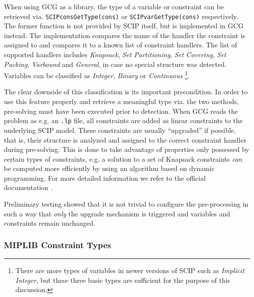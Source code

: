 				When using \ac{GCG} as a library, the type of a variable or constraint can be retrieved via. \lstinline|SCIPconsGetType(cons)| or \lstinline|SCIPvarGetType(cons)| respectively.
				The former function is not provided by \ac{SCIP} itself, but is implemented in \ac{GCG} instead.
				The implementation compares the name of the handler the constraint is assigned to and compares it to a known list of constraint handlers. 
				The list of supported handlers includes \emph{Knapsack}, \emph{Set Partitioning}, \emph{Set Covering}, \emph{Set Packing}, \emph{Varbound} and \emph{General}, in case no special structure was detected. 
				Variables can be classified as \emph{Integer}, \emph{Binary} or \emph{Continuous}
				\footnote{There are more types of variables in newer versions of \ac{SCIP} such as \emph{Implicit Integer}, but these three basic types are sufficient for the purpose of this discussion.}.
				
				The clear downside of this classification is its important precondition.
				In order to use this feature properly and retrieve a meaningful type via. the two methods, pre-solving must have been executed prior to detection.
				When \ac{GCG} reads the problem as e.g. an \lstinline|.lp| file, all constraints are added as linear constraints to the underlying \ac{SCIP} model.
				These constraints are usually \enquote{upgraded} if possible, that is, their structure is analyzed and assigned to the correct constraint handler during pre-solving.
				This is done to take advantage of properties only possessed by certain types of constraints, e.g. a solution to a set of Knapsack constraints \textit{can} be computed more efficiently by using an algorithm based on dynamic programming.
				For more detailed information we refer to the official documentation \cite{SCIPDoxygenDocumentation}.
				
				Preliminary testing showed that it is not trivial to configure the pre-processing in such a way that \textit{only} the upgrade mechanism is triggered and variables and constraints remain unchanged. 
				
				\clearpage
		
			\subsubsection{MIPLIB Constraint Types}
			

